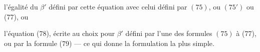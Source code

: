 l'égalité du $\beta'$ défini par cette équation avec  celui défini par  $(75)$, ou $(75')$ ou (77), ou

l'équation (78), écrite au choix pour $\beta'$ défini par l'une des formules $(75)$ à (77), ou par la formule (79) --- ce qui donne la formulation la plus simple.
